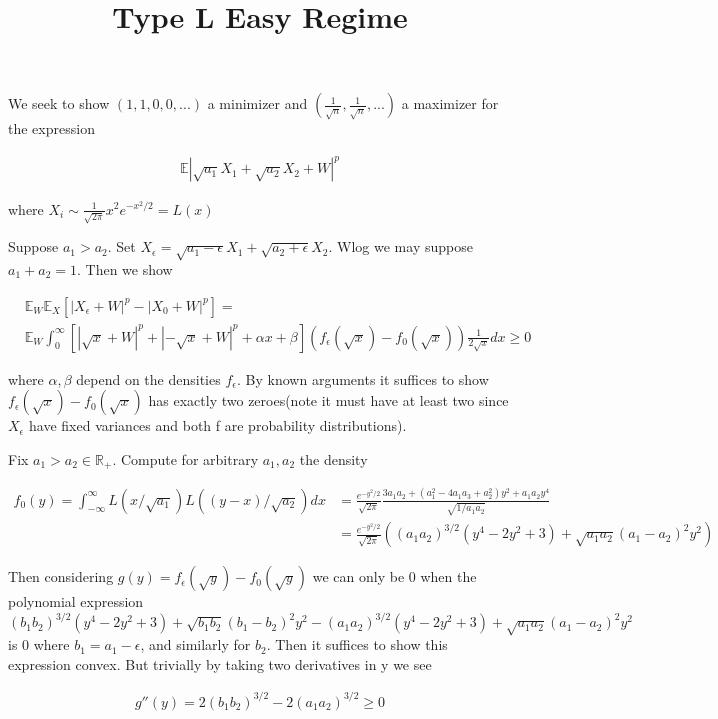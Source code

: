 \documentclass[11pt]{article}
\title{Type L Easy Regime}
\newcommand{\R}{\mathbb{R}}
\newcommand{\E}{\mathbb{E}}
\theoremstyle{remark}
\begin{document}
\maketitle

We seek to show $(1,1,0,0,...)$ a minimizer and $(\frac{1}{\sqrt{n}},\frac{1}{\sqrt{n}},...)$ a maximizer for the expression

\begin{align*}
	\E|\sqrt{a_1}X_1 + \sqrt{a_2}X_2 + W|^p
\end{align*}

where $X_i \sim \frac{1}{\sqrt{2 \pi }}x^2e^{-x^2/2} = L(x)$

Suppose $a_1 > a_2$. Set $X_{\epsilon} = \sqrt{a_1-\epsilon}X_1 + \sqrt{a_2+\epsilon}X_2$. Wlog  we may suppose $a_1 + a_2 =1$. Then we show

\begin{align*}
	&\E_W \E_X [|X_{\epsilon} + W|^p - |X_0 + W|^p] =\\ 
	&\E_W \int_0^{\infty} [|\sqrt{x}+W|^p+|-\sqrt{x}+W|^p+\alpha x + \beta](f_{\epsilon}(\sqrt{x}) - f_0(\sqrt{x}))\frac{1}{2\sqrt{x}}dx
	 \geq 0
\end{align*}

where $\alpha, \beta$ depend on the densities $f_{\epsilon}$. By known arguments it suffices to show $f_{\epsilon}(\sqrt{x}) - f_0(\sqrt{x})$ has exactly two zeroes(note it must have at least two since $X_{\epsilon}$ have fixed variances and both f are probability distributions).

Fix $a_1 > a_2 \in \R_+$. Compute for arbitrary $a_1,a_2$ the density

\begin{align*}
	f_0(y) = \int_{-\infty}^{\infty} L(x/\sqrt{a_1})L((y-x)/\sqrt{a_2}) dx &= \frac{e^{-y^2/2}}{\sqrt{2\pi}}\frac{3a_1a_2 + (a_1^2-4a_1a_3 + a_2^2)y^2 + a_1a_2y^4}{\sqrt{1/a_1a_2}} \\ 
	&= \frac{e^{-y^2/2}}{\sqrt{2\pi}} ((a_1a_2)^{3/2}(y^4-2y^2+3) + \sqrt{a_1a_2}(a_1-a_2)^2y^2)
\end{align*}

Then considering $g(y) = f_{\epsilon}(\sqrt{y}) - f_0(\sqrt{y})$ we can only be 0 when the polynomial expression $(b_1b_2)^{3/2}(y^4-2y^2+3) + \sqrt{b_1b_2}(b_1-b_2)^2y^2-(a_1a_2)^{3/2}(y^4-2y^2+3) + \sqrt{a_1a_2}(a_1-a_2)^2y^2$ is 0 where $b_1  = a_1 - \epsilon$, and similarly for $b_2$. Then it suffices to show this expression convex. But trivially by taking two derivatives in y we see

\begin{align*}
	g''(y) =  2(b_1b_2)^{3/2}-2(a_1a_2)^{3/2} \geq 0
\end{align*}
\end{document}
